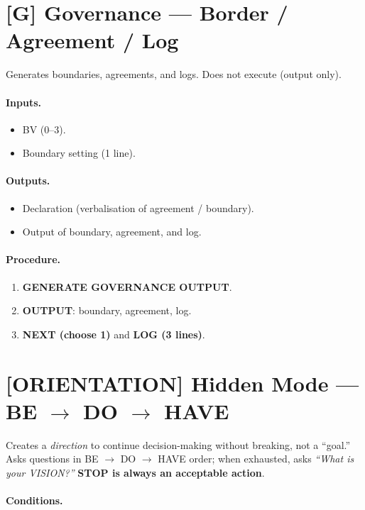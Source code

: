 \section{[G] Governance --- Border / Agreement / Log}
\label{sec:secretary-G}

Generates boundaries, agreements, and logs. Does not execute (output
only).

\paragraph{Inputs.}
\begin{itemize}
\item BV ($0$--$3$).
\item Boundary setting (1 line).
\end{itemize}

\paragraph{Outputs.}
\begin{itemize}
\item Declaration (verbalisation of agreement / boundary).
\item Output of boundary, agreement, and log.
\end{itemize}

\clearpage
\paragraph{Procedure.}
\begin{enumerate}
\item \textbf{GENERATE GOVERNANCE OUTPUT}.
\item \textbf{OUTPUT}: boundary, agreement, log.
\item \textbf{NEXT (choose 1)} and \textbf{LOG (3 lines)}.
\end{enumerate}

\section{[ORIENTATION] Hidden Mode --- BE $\to$ DO $\to$ HAVE}
\label{sec:secretary-orientation}

Creates a \emph{direction} to continue decision-making without
breaking, not a ``goal.'' Asks questions in BE $\to$ DO $\to$ HAVE
order; when exhausted, asks \textit{``What is your VISION?''}
\textbf{STOP is always an acceptable action}.

\paragraph{Conditions.}

